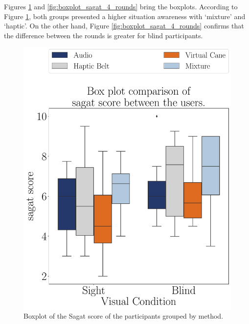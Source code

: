 Figures \ref{fig:boxplot_sagat_4_scene} and \ref{fig:boxplot_sagat_4_rounds} bring the boxplots. According to Figure \ref{fig:boxplot_sagat_4_scene}, both groups presented a higher situation awareness with ‘mixture’ and ‘haptic’. On the other hand, Figure \ref{fig:boxplot_sagat_4_rounds} confirms that the difference between the rounds is greater for blind participants. 

\begin{figure}[!thb]
    \centering
    \begin{minipage}{0.45\textwidth}
        \centering
        \includegraphics[width = 0.8\linewidth]{Resultados/Sagat/Figuras/pdf/boxplot_sagat_4_scene.pdf}
        \caption{Boxplot of the Sagat score of the participants grouped by method.}
        \label{fig:boxplot_sagat_4_scene}
    \end{minipage}
    \begin{minipage}{0.075\textwidth}
        \hfill
    \end{minipage}
    \begin{minipage}{0.45\textwidth}
        \centering

\end{minipage}
\end{figure}
